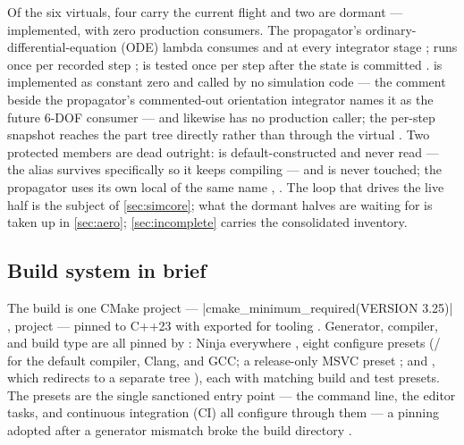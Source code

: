 Of the six virtuals, four carry the current flight and two are dormant --- implemented,
with zero production consumers. The propagator's ordinary-differential-equation
(ODE) lambda consumes  and  at every integrator stage
;  runs once per recorded step
;  is tested once per step after the
state is committed .  is implemented as
constant zero  and called by no simulation code --- the
comment beside the propagator's commented-out orientation integrator names it as the
future 6-DOF consumer  --- and
 likewise has no production caller; the per-step snapshot
reaches the part tree directly rather than through the virtual
. Two protected members are dead outright: 
is default-constructed and never read  --- the
 alias survives specifically so it keeps compiling 
--- and  is never touched; the propagator uses its own local of the same
name , . The loop that drives
the live half is the subject of \cref{sec:simcore}; what the dormant halves are waiting
for is taken up in \cref{sec:aero}; \cref{sec:incomplete} carries the consolidated
inventory.

\subsection{Build system in brief}\label{sec:overview-build}

The build is one CMake project --- \cppinline|cmake_minimum_required(VERSION 3.25)|
, project   --- pinned to
C++23  with  exported for tooling
. Generator, compiler, and build type are all pinned by
: Ninja everywhere , eight configure
presets (/ for the default compiler, Clang, and GCC; a
release-only MSVC preset ; and , which
redirects to a separate  tree ), each
with matching build and test presets. The presets are the single sanctioned entry point
--- the command line, the editor tasks, and continuous integration (CI) all configure
through them --- a pinning adopted after a generator mismatch broke the build directory
.

